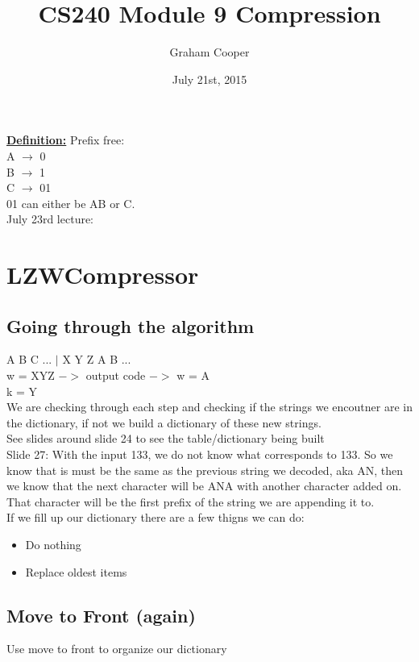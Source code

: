 \documentclass[12pt]{article}
\title{\vspace{-15ex}CS240 Module 9 Compression\vspace{-1ex}}
\date{July 21st, 2015}
\author{Graham Cooper}
\newcommand{\myt}[1]{\textbf{\underline{#1}}}
\begin{document}
	\maketitle
	
	\myt{Definition:} Prefix free:\\
	A $\rightarrow$ 0\\
	B $\rightarrow$ 1\\
	C $\rightarrow$ 01\\
	
	01 can either be AB or C.\\
	
	July 23rd lecture:\\
	
	\section*{LZWCompressor}
	\subsection{Going through the algorithm}
	A B C ... $|$ X Y Z A B ...\\
	w = XYZ $->$ output code $->$ w = A\\
	k = Y\\
	
	We are checking through each step and checking if the strings we encoutner are in the dictionary, if not we build a dictionary of these new strings.\\
	
	See slides around slide 24 to see the table/dictionary being built\\
	
	Slide 27: With the input 133, we do not know what corresponds to 133. So we know that is must be the same as the previous string we decoded, aka AN, then we know that the next character will be ANA with another character added on. That character will be the first prefix of the string we are appending it to.\\
	
	If we fill up our dictionary there are a few thigns we can do:\\
	\begin{itemize}
		\item Do nothing
		\item Replace oldest items
	\end{itemize}
	
	\subsection*{Move to Front (again)}
	Use move to front to organize our dictionary\\
	
\end{document}
